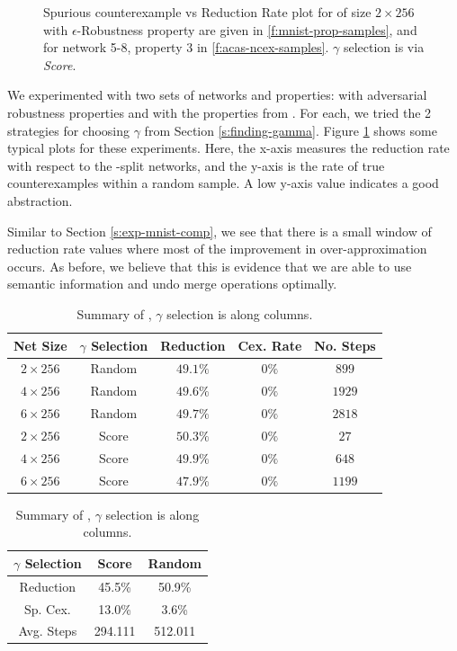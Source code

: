 \begin{figure}
    \caption{
        Spurious counterexample vs Reduction Rate plot for \mnist of size $2
        \times 256$ with $\epsilon$-Robustness property are given in 
        \ref{f:mnist-prop-samples}, and for \acasxu
        network 5-8, property 3 in \ref{f:acas-ncex-samples}.
        $\gamma$ selection is via \emph{Score}. 
    }
    \label{f:ncex}
\end{figure}

We experimented with two sets of networks and properties: \mnist with
adversarial robustness properties and \acasxu with the properties from
\cite{reluplex}. For each, we tried the 2 strategies for choosing $\gamma$ from
Section \ref{s:finding-gamma}.
Figure \ref{f:ncex} shows some typical plots
for these experiments. Here, the x-axis measures the reduction rate with respect
to the \inc-\dec split networks, and the y-axis is the rate of true
counterexamples within a random sample. A low y-axis value indicates a good
abstraction.

Similar to Section \ref{s:exp-mnist-comp}, we see that there is a small window
of reduction rate values where most of the improvement in over-approximation
occurs. As before, we believe that this is evidence that we are able to use
semantic information and undo merge operations optimally.

\begin{table}
\parbox{0.60\textwidth}{
\begin{tabular}{|c|c|c|c|c|}
    \hline
    Net Size     & $\gamma$ Selection  & Reduction & Cex. Rate & No. Steps \\
    \hline
    $2\times256$ & Random              & $49.1\%$  & $  0\%$  & $ 899$    \\
    $4\times256$ & Random              & $49.6\%$  & $  0\%$  & $1929$    \\
    $6\times256$ & Random              & $49.7\%$  & $  0\%$  & $2818$    \\
    $2\times256$ & Score               & $50.3\%$  & $  0\%$  & $  27$    \\
    $4\times256$ & Score               & $49.9\%$  & $  0\%$  & $ 648$    \\
    $6\times256$ & Score               & $47.9\%$  & $  0\%$  & $1199$    \\
    \hline
\end{tabular}
\caption{Summary of \mnist Results on a single robustness property }
\label{t:mnist-prop-summary}
}
\quad
\parbox{0.30\textwidth}{
\begin{tabular}{|c|cc|}
\hline
$\gamma$ Selection  & Score   & Random  \\
\hline
Reduction  & 45.5\%  & 50.9\%  \\
Sp. Cex.   & 13.0\%  & 3.6\%   \\
Avg. Steps & 294.111 & 512.011 \\
\hline
\end{tabular}
\caption{Summary of \acasxu, $\gamma$ selection is along columns.}
\label{t:acas-ncex}
}
\vspace{-1cm}
\end{table}

